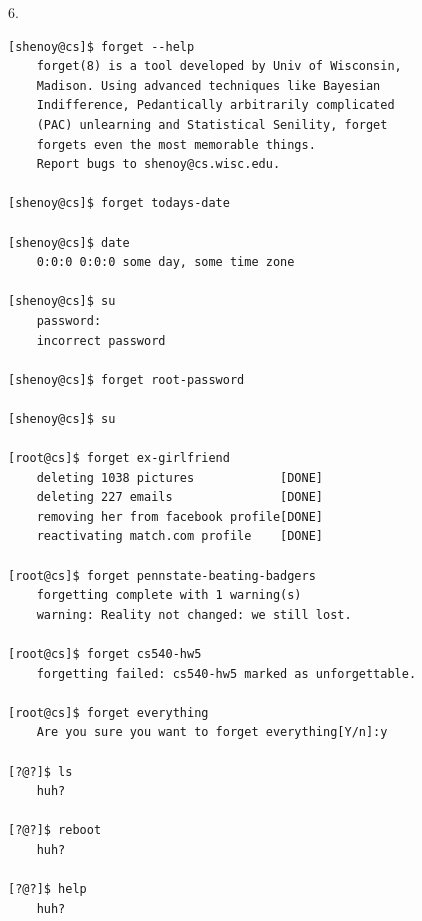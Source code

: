 \documentclass[11pt]{article}
\begin{document}
6.
\begin{lstlisting}[frame=single]
[shenoy@cs]$ forget --help
	forget(8) is a tool developed by Univ of Wisconsin,
	Madison. Using advanced techniques like Bayesian
	Indifference, Pedantically arbitrarily complicated
	(PAC) unlearning and Statistical Senility, forget
	forgets even the most memorable things.
	Report bugs to shenoy@cs.wisc.edu.

[shenoy@cs]$ forget todays-date

[shenoy@cs]$ date
	0:0:0 0:0:0 some day, some time zone

[shenoy@cs]$ su
	password:
	incorrect password

[shenoy@cs]$ forget root-password

[shenoy@cs]$ su

[root@cs]$ forget ex-girlfriend
	deleting 1038 pictures            [DONE]
	deleting 227 emails               [DONE]
	removing her from facebook profile[DONE]
	reactivating match.com profile    [DONE]	

[root@cs]$ forget pennstate-beating-badgers
	forgetting complete with 1 warning(s)
	warning: Reality not changed: we still lost.

[root@cs]$ forget cs540-hw5
	forgetting failed: cs540-hw5 marked as unforgettable.

[root@cs]$ forget everything
	Are you sure you want to forget everything[Y/n]:y

[?@?]$ ls
	huh?

[?@?]$ reboot
	huh?

[?@?]$ help
	huh?
\end{lstlisting}
\end{document}
